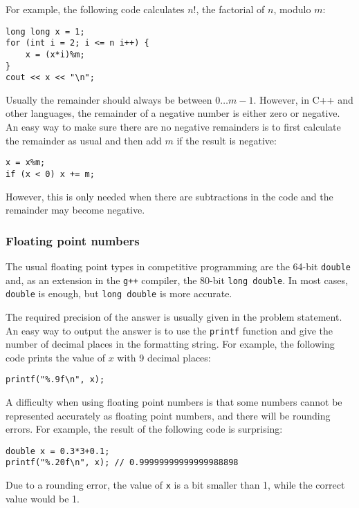 For example, the following code calculates $n!$,
the factorial of $n$, modulo $m$:
\begin{lstlisting}
long long x = 1;
for (int i = 2; i <= n i++) {
    x = (x*i)%m;
}
cout << x << "\n";
\end{lstlisting}

Usually the remainder should always
be between $0\ldots m-1$.
However, in C++ and other languages,
the remainder of a negative number
is either zero or negative.
An easy way to make sure there
are no negative remainders is to first calculate
the remainder as usual and then add $m$
if the result is negative:
\begin{lstlisting}
x = x%m;
if (x < 0) x += m;
\end{lstlisting}
However, this is only needed when there
are subtractions in the code and the
remainder may become negative.

\subsubsection{Floating point numbers}


The usual floating point types in
competitive programming are
the 64-bit \texttt{double}
and, as an extension in the \texttt{g++} compiler,
the 80-bit \texttt{long double}.
In most cases, \texttt{double} is enough,
but \texttt{long double} is more accurate.

The required precision of the answer
is usually given in the problem statement.
An easy way to output the answer is to use
the \texttt{printf} function
and give the number of decimal places
in the formatting string.
For example, the following code prints
the value of $x$ with 9 decimal places:

\begin{lstlisting}
printf("%.9f\n", x);
\end{lstlisting}

A difficulty when using floating point numbers
is that some numbers cannot be represented
accurately as floating point numbers,
and there will be rounding errors.
For example, the result of the following code
is surprising:

\begin{lstlisting}
double x = 0.3*3+0.1;
printf("%.20f\n", x); // 0.99999999999999988898
\end{lstlisting}

Due to a rounding error,
the value of \texttt{x} is a bit smaller than 1,
while the correct value would be 1.

